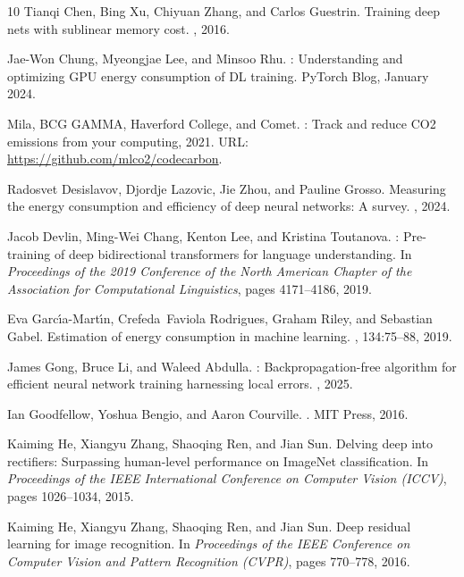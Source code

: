 \documentclass[11pt, english]{article}
\begin{document}
\begin{thebibliography}{10}
Tianqi Chen, Bing Xu, Chiyuan Zhang, and Carlos Guestrin.
\newblock Training deep nets with sublinear memory cost.
, 2016.

Jae-Won Chung, Myeongjae Lee, and Minsoo Rhu.
: Understanding and optimizing {GPU} energy consumption of {DL}
  training.
\newblock PyTorch Blog, January 2024.

{Mila}, {BCG GAMMA}, {Haverford College}, and {Comet}.
: Track and reduce {CO2} emissions from your computing,
  2021.
\newblock URL: \url{https://github.com/mlco2/codecarbon}.

Radosvet Desislavov, Djordje Lazovic, Jie Zhou, and Pauline Grosso.
\newblock Measuring the energy consumption and efficiency of deep neural
  networks: A survey.
, 2024.

Jacob Devlin, Ming-Wei Chang, Kenton Lee, and Kristina Toutanova.
: Pre-training of deep bidirectional transformers for language
  understanding.
\newblock In {\em Proceedings of the 2019 Conference of the North American
  Chapter of the Association for Computational Linguistics}, pages 4171--4186,
  2019.

Eva Garc{\'\i}a-Mart{\'\i}n, Crefeda~Faviola Rodrigues, Graham Riley, and
  Sebastian Gabel.
\newblock Estimation of energy consumption in machine learning.
, 134:75--88,
  2019.

James Gong, Bruce Li, and Waleed Abdulla.
: Backpropagation-free algorithm for efficient neural
  network training harnessing local errors.
, 2025.

Ian Goodfellow, Yoshua Bengio, and Aaron Courville.
.
\newblock MIT Press, 2016.

Kaiming He, Xiangyu Zhang, Shaoqing Ren, and Jian Sun.
\newblock Delving deep into rectifiers: Surpassing human-level performance on
  {ImageNet} classification.
\newblock In {\em Proceedings of the {IEEE} International Conference on
  Computer Vision (ICCV)}, pages 1026--1034, 2015.

Kaiming He, Xiangyu Zhang, Shaoqing Ren, and Jian Sun.
\newblock Deep residual learning for image recognition.
\newblock In {\em Proceedings of the {IEEE} Conference on Computer Vision and
  Pattern Recognition (CVPR)}, pages 770--778, 2016.


\end{thebibliography}
\end{document}
